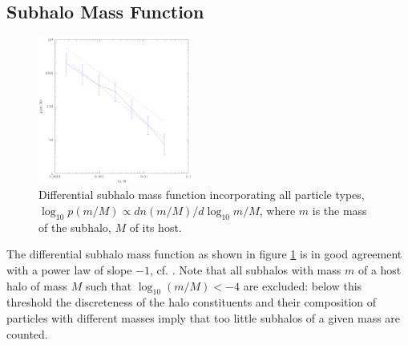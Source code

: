 \documentclass[useAMS,usenatbib]{mn2e}
\begin{document}
\subsection{Subhalo Mass Function}
%
%
\begin{figure}
  \begin{center}
    \includegraphics[width=0.45\textwidth]{fig/shmf/out.eps}
  \end{center}

  \caption{ \label{fig:shmf} Differential subhalo mass function incorporating
    all particle types, $\log_{10}p(m/M)\propto dn(m/M)/d\log_{10}m/M$, where
    $m$ is the mass of the subhalo, $M$ of its host. }
\end{figure}
%
%
The differential subhalo mass function as shown in figure \ref{fig:shmf} is in
good agreement with a power law of slope $-1$, cf. \cite{DeLucia2004}. Note
that all subhalos with mass $m$ of a host halo of mass $M$ such that
$\log_{10}(m/M)<-4$ are excluded: below this threshold the discreteness of the
halo constituents and their composition of particles with different masses
imply that too little subhalos of a given mass are counted.
%
%
\end{document}
